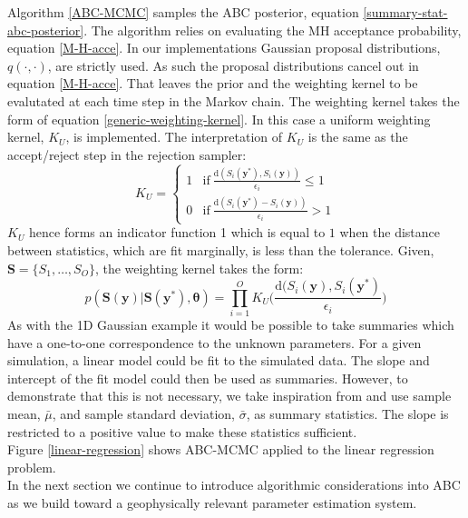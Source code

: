 Algorithm \ref{ABC-MCMC} samples the ABC posterior, equation \ref{summary-stat-abc-posterior}. The algorithm relies on evaluating the MH acceptance probability, equation \ref{M-H-acce}. In our implementations Gaussian proposal distributions, $q(\cdot,\cdot)$, are strictly used. As such the proposal distributions cancel out in equation \ref{M-H-acce}. That leaves the prior and the weighting kernel to be evalutated at each time step in the Markov chain. The weighting kernel takes the form of equation \ref{generic-weighting-kernel}. In this case a uniform weighting kernel, $K_U$, is implemented. The interpretation of $K_U$ is the same as the accept/reject step in the rejection sampler: 
\begin{equation}
	K_U = 
	\begin{cases}
		1 & \text{if}\ 	\frac{\text{d}(S_i(\bm{y^*}),S_i(\bm{y}))}				{\epsilon_i} \leq 1\\
		0 & \text{if}\ \frac{\text{d}(S_i(\bm{y^*}) - S_i(\bm{y}))}				{\epsilon_i} > 1
	\end{cases}
\end{equation}
$K_U$ hence forms an indicator function 1 which is equal to $1$ when the distance between statistics, which are fit marginally, is less than the tolerance. Given, $\bm{S} = \{S_1,\dots,S_O\}$, the weighting kernel takes the form:
\begin{equation}
	p(\bm{S}(\bm{y})|\bm{S}(\bm{y^*}),\bm{\theta}) = \prod_{i = 1}^{O} K_U\Big(\frac{\text{d}(S_i(\bm{y}),S_i(\bm{y^*})}{\epsilon_i}\Big)
	\label{weight-kernel}
\end{equation}
\noindent
As with the 1D Gaussian example it would be possible to take summaries which have a one-to-one correspondence to the unknown parameters. For a given simulation, a linear model could be fit to the simulated data. The slope and intercept of the fit model could then be used as summaries. However, to demonstrate that this is not necessary, we take inspiration from \citet{vrugt2013toward} and use sample mean, $\bar{\mu}$, and sample standard deviation, $\bar{\sigma}$, as summary statistics. The slope is restricted to a positive value to make these statistics sufficient. \\

Figure \ref{linear-regression} shows ABC-MCMC applied to the linear regression problem. \\

In the next section we continue to introduce algorithmic considerations into ABC as we build toward a geophysically relevant parameter estimation system. \\

